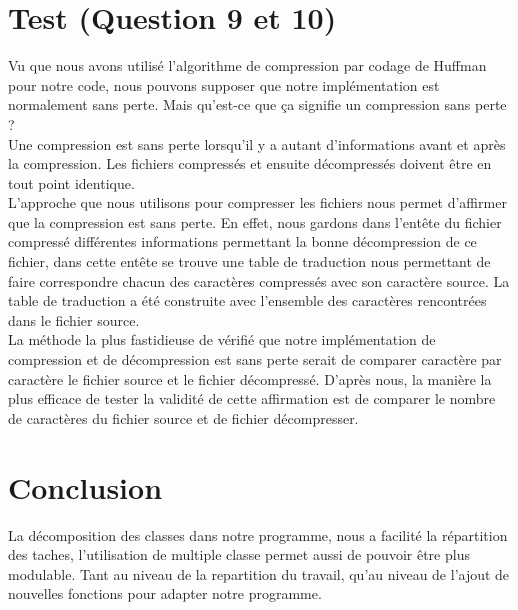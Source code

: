 \documentclass[10pt,a4paper]{article}
\begin{document}
\section*{Test (Question 9 et 10)}

Vu que nous avons utilisé l'algorithme de compression par codage de Huffman pour notre code, nous pouvons supposer que notre implémentation est normalement sans perte. Mais qu'est-ce que ça signifie un compression sans perte ? \\ Une compression est sans perte lorsqu'il y a autant d'informations avant et après la compression. Les fichiers compressés et ensuite décompressés doivent être en tout point identique.\\
L'approche que nous utilisons pour compresser les fichiers nous permet d'affirmer que la compression est sans perte. En effet, nous gardons dans l'entête du fichier compressé différentes informations permettant la bonne décompression de ce fichier, dans cette entête se trouve une table de traduction nous permettant de faire correspondre chacun des caractères compressés avec son caractère source. La table de traduction a été construite avec l'ensemble des caractères rencontrées dans le fichier source. \\La méthode la plus fastidieuse de vérifié que notre implémentation de compression et de décompression est sans perte serait de comparer caractère par caractère le fichier source et le fichier décompressé. D'après nous, la manière la plus efficace de tester la validité de cette affirmation est de comparer le nombre de caractères du fichier source et de fichier décompresser.

\section*{Conclusion}
La décomposition des classes dans notre programme, nous a facilité la répartition des taches, l'utilisation de multiple classe permet aussi de pouvoir être plus modulable. Tant au niveau de la repartition du travail, qu'au niveau de l'ajout de nouvelles fonctions pour adapter notre programme.\\ 
\end{document}
